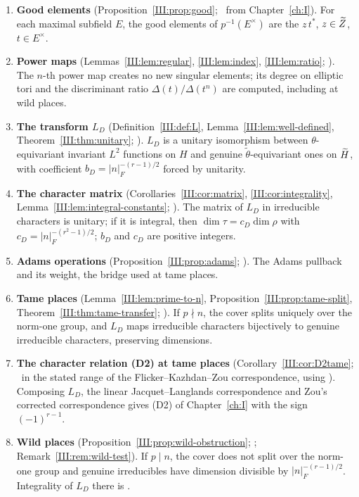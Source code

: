 \begin{enumerate}[leftmargin=*,label=\arabic*.]
\item \textbf{Good elements} (Proposition~\ref{III:prop:good}; \Etag\ from Chapter~\ref{ch:I}). For each maximal subfield $E$, the good elements of $p^{-1}(E^\times)$ are the $z\,t^*$, $z\in\widetilde Z$, $t\in E^\times$.
\item \textbf{Power maps} (Lemmas~\ref{III:lem:regular}, \ref{III:lem:index}, \ref{III:lem:ratio}; \Ptag). The $n$-th power map creates no new singular elements; its degree on elliptic tori and the discriminant ratio $\Delta(t)/\Delta(t^n)$ are computed, including at wild places.
\item \textbf{The transform $L_D$} (Definition~\ref{III:def:L}, Lemma~\ref{III:lem:well-defined}, Theorem~\ref{III:thm:unitary}; \Ptag). $L_D$ is a unitary isomorphism between $\theta$-equivariant invariant $L^2$ functions on $H$ and genuine $\tilde\theta$-equivariant ones on $\widetilde H$, with coefficient $b_D=|n|_F^{-(r-1)/2}$ forced by unitarity.
\item \textbf{The character matrix} (Corollaries~\ref{III:cor:matrix}, \ref{III:cor:integrality}, Lemma~\ref{III:lem:integral-constants}; \Ptag). The matrix of $L_D$ in irreducible characters is unitary; if it is integral, then $\dim\tau=c_D\dim\rho$ with $c_D=|n|_F^{-(r^2-1)/2}$; $b_D$ and $c_D$ are positive integers.
\item \textbf{Adams operations} (Proposition~\ref{III:prop:adams}; \Ptag). The Adams pullback and its weight, the bridge used at tame places.
\item \textbf{Tame places} (Lemma~\ref{III:lem:prime-to-n}, Proposition~\ref{III:prop:tame-split}, Theorem~\ref{III:thm:tame-transfer}; \Ptag). If $p\nmid n$, the cover splits uniquely over the norm-one group, and $L_D$ maps irreducible characters bijectively to genuine irreducible characters, preserving dimensions.
\item \textbf{The character relation (D2) at tame places} (Corollary~\ref{III:cor:D2tame}; \Ptag\ in the stated range of the Flicker--Kazhdan--Zou correspondence, using \Etag). Composing $L_D$, the linear Jacquet--Langlands correspondence and Zou's corrected correspondence gives (D2) of Chapter~\ref{ch:I} with the sign $(-1)^{r-1}$.
\item \textbf{Wild places} (Proposition~\ref{III:prop:wild-obstruction}; \Ptag; Remark~\ref{III:rem:wild-test}). If $p\mid n$, the cover does not split over the norm-one group and genuine irreducibles have dimension divisible by $|n|_F^{-(r-1)/2}$. Integrality of $L_D$ there is \Ctag.

\end{enumerate}
